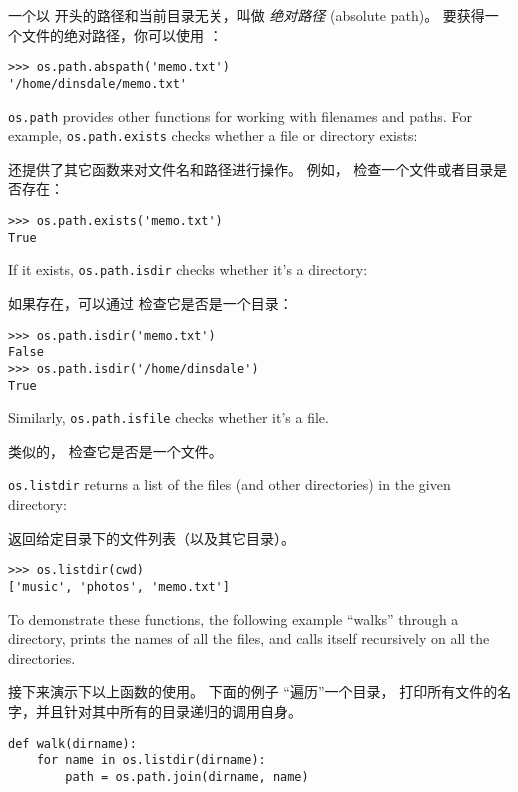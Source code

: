 {{{{{{{一个以 \li{/} 开头的路径和当前目录无关，叫做 {\em 绝对路径} (absolute path)。 要获得一个文件的绝对路径，你可以使用  ：

\begin{lstlisting}
>>> os.path.abspath('memo.txt')
'/home/dinsdale/memo.txt'
\end{lstlisting}
%
{\tt os.path} provides other functions for working with filenames
and paths.  For example,
{\tt os.path.exists} checks
whether a file or directory exists:

 还提供了其它函数来对文件名和路径进行操作。  例如， 检查一个文件或者目录是否存在：


\begin{lstlisting}
>>> os.path.exists('memo.txt')
True
\end{lstlisting}

%
If it exists, {\tt os.path.isdir} checks whether it's a directory:

如果存在，可以通过  检查它是否是一个目录：

\begin{lstlisting}
>>> os.path.isdir('memo.txt')
False
>>> os.path.isdir('/home/dinsdale')
True
\end{lstlisting}

%
Similarly, {\tt os.path.isfile} checks whether it's a file.

类似的，  检查它是否是一个文件。

{\tt os.listdir} returns a list of the files (and other directories)
in the given directory:

 返回给定目录下的文件列表（以及其它目录）。

\begin{lstlisting}
>>> os.listdir(cwd)
['music', 'photos', 'memo.txt']
\end{lstlisting}

%
To demonstrate these functions, the following example
``walks'' through a directory, prints
the names of all the files, and calls itself recursively on
all the directories.

接下来演示下以上函数的使用。 下面的例子 ``遍历''一个目录， 打印所有文件的名字，并且针对其中所有的目录递归的调用自身。

  

\begin{lstlisting}
def walk(dirname):
    for name in os.listdir(dirname):
        path = os.path.join(dirname, name)


\end{lstlisting}}}}}}}}
